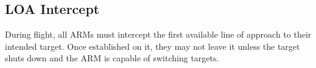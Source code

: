 



\subsection{LOA Intercept} During flight, all ARMs must intercept the first available line of approach to their intended target. Once established on it, they may not leave it unless the target shuts down and the ARM is capable of switching targets.


